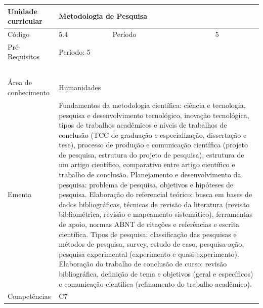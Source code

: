 \clearpage
\newpage

\begin{quadro}[ht!]
  \centering\scriptsize
\caption{Unidade Curricular Metodologia de Pesquisa}

\begin{tabular}{|p{2.5cm}|p{2.5cm}|p{2.5cm}|p{2.5cm}|p{2.5cm}|}\hline

  Unidade curricular & \multicolumn{4}{p{10cm}|}{ Metodologia de Pesquisa }\\\hline
  Código & 5.4 & Período & \multicolumn{2}{p{5cm}|}{ 5 }\\\hline
  Pré-Requisitos & \multicolumn{4}{p{10cm}|}{ Período: 5 } \\\hline
  \cellcolor{blue1}{ CH PRESENCIAL } &
    \cellcolor{blue1}{CH EAD Síncrona} &
    \cellcolor{blue1}{CH EAD Síncrona Mediada} &
    \cellcolor{blue1}{CH EAD Assíncrona} &
    \cellcolor{blue1}{CH APCC} \\\hline
  \cellcolor{blue1}{ 30 } &
    \cellcolor{blue1}{ 0 } &
    \cellcolor{blue1}{ 0 } &
    \cellcolor{blue1}{ 0 } &
    \cellcolor{blue1}{0} \\\hline
  \cellcolor{blue1}{ CH Teórica } &
    \cellcolor{blue1}{CH Prática} &
    \cellcolor{blue1}{CH Humanidades} &
    \cellcolor{blue1}{CH Extensão} &
    \cellcolor{blue1}{CH EAD TOTAL} \\\hline
  \cellcolor{blue1}{ 15 } &
    \cellcolor{blue1}{ 15 } &
    \cellcolor{blue1}{ 30 } &
    \cellcolor{blue1}{ 0 } &
    \cellcolor{blue1}{ 0 } \\\hline
  \cellcolor{blue1}{CARGA-HORÁRIA TOTAL} & \multicolumn{4}{p{10cm}|}{ \cellcolor{blue1}{ 30 } } \\\hline
  Área de conhecimento & \multicolumn{4}{p{10cm}|}{ Humanidades } \\\hline
  Ementa & \multicolumn{4}{p{10cm}|}{ Fundamentos da metodologia científica: ciência e tecnologia, pesquisa e desenvolvimento tecnológico, inovação tecnológica, tipos de trabalhos acadêmicos e níveis de trabalhos de conclusão (TCC de graduação e especialização, dissertação e tese), processo de produção e comunicação científica (projeto de pesquisa, estrutura do projeto de pesquisa), estrutura de um artigo científico, comparativo entre artigo científico e trabalho de conclusão. Planejamento e desenvolvimento da pesquisa: problema de pesquisa, objetivos e hipóteses de pesquisa. Elaboração do referencial teórico: busca em bases de dados bibliográficas, técnicas de revisão da literatura (revisão bibliométrica, revisão e mapeamento sistemático), ferramentas de apoio, normas ABNT de citações e referências e escrita científica. Tipos de pesquisa: classificação das pesquisas e métodos de pesquisa, survey, estudo de caso, pesquisa-ação, pesquisa experimental (experimento e quasi-experimento). Elaboração do trabalho de conclusão de curso: revisão bibliográfica, definição de tema e objetivos (geral e específicos) e comunicação científica (refinamento do trabalho acadêmico). } \\\hline
  Competências & \multicolumn{4}{p{10cm}|}{ C7 } \\\hline



\end{tabular}
\end{quadro}
